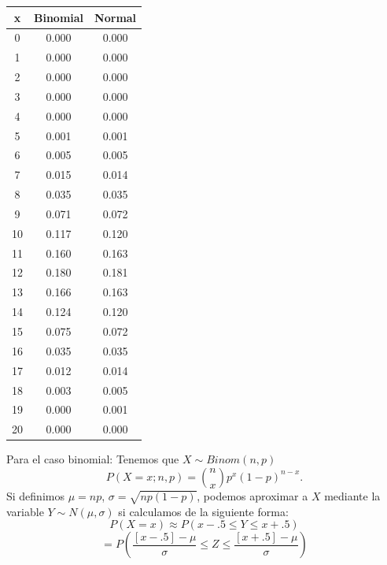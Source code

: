 \documentclass[
  10pt,
  ignorenonframetext,
]{beamer}
\begin{document}
\begin{frame}{}
\protect\hypertarget{section-35}{}
\begin{minipage}{\textwidth}

\begin{multicols}{2}


\begin{table}
\centering\begingroup\fontsize{9}{11}\selectfont

\begin{tabular}{c|c|c}
\hline
x & Binomial & Normal\\
\hline
0 & 0.000 & 0.000\\
\hline
1 & 0.000 & 0.000\\
\hline
2 & 0.000 & 0.000\\
\hline
3 & 0.000 & 0.000\\
\hline
4 & 0.000 & 0.000\\
\hline
5 & 0.001 & 0.001\\
\hline
6 & 0.005 & 0.005\\
\hline
7 & 0.015 & 0.014\\
\hline
8 & 0.035 & 0.035\\
\hline
9 & 0.071 & 0.072\\
\hline
10 & 0.117 & 0.120\\
\hline
11 & 0.160 & 0.163\\
\hline
12 & 0.180 & 0.181\\
\hline
13 & 0.166 & 0.163\\
\hline
14 & 0.124 & 0.120\\
\hline
15 & 0.075 & 0.072\\
\hline
16 & 0.035 & 0.035\\
\hline
17 & 0.012 & 0.014\\
\hline
18 & 0.003 & 0.005\\
\hline
19 & 0.000 & 0.001\\
\hline
20 & 0.000 & 0.000\\
\hline
\end{tabular}
\endgroup{}
\end{table}

Para el caso binomial: Tenemos que $X\sim Binom(n,p)$
$$P(X=x;n,p)= \binom{n}{x}p^x (1-p)^{n-x}.$$
Si definimos $\mu=np$, $\sigma=\sqrt{np(1-p)}$, podemos aproximar a $X$ mediante la variable $Y\sim N(\mu,\sigma)$ si calculamos de la siguiente forma:
$$P(X=x) \approx P(x-.5 \le Y \le x+.5)$$
$$=P\left(\frac{[x-.5] - \mu}{\sigma} \le Z\le \frac{[x+.5]- \mu}{\sigma}\right)$$



\end{multicols}

\end{minipage}
\end{frame}
\end{document}
